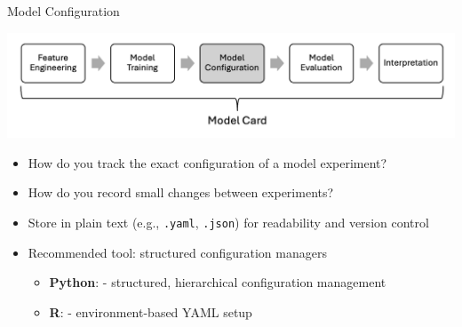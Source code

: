 \documentclass[10pt,compress,t,notes=noshow, xcolor=table]{beamer}
\begin{document}
\begin{frame}[t]{Model Configuration}
\label{model-configuration}

\includegraphics[width=\linewidth, trim=0 60 0 0, clip]{figure_man/Modelling4.png}

\vspace{0.5em}
\begin{itemize}
  \item How do you track the exact configuration of a model experiment?
  \item How do you record small changes between experiments?
  \item Store in plain text (e.g., \texttt{.yaml}, \texttt{.json}) for readability and version control
\item Recommended tool: structured configuration managers
    \begin{itemize}
      \item \textbf{Python}:  - structured, hierarchical configuration management
      \item \textbf{R}:  - environment-based YAML setup
    \end{itemize}
\end{itemize}
\end{frame}


\end{document}
